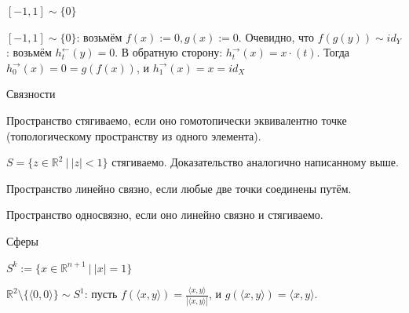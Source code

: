\documentclass[aspectratio=169,dvipsnames,usenames]{beamer}
\begin{document}
\begin{frame}{$[-1,1] \sim \{0\}$}

$[-1,1] \sim \{0\}$: возьмём $f(x) := 0, g(x) := 0$. Очевидно, что $f(g(y)) \sim id_Y$: возьмём $h^\leftarrow_t(y) = 0$.
В обратную сторону: $h^\rightarrow_t(x) = x\cdot (t)$. Тогда $h^\rightarrow_0(x) = 0 = g(f(x))$, и
$h^\rightarrow_1(x) = x = id_X$

\begin{center}\end{center}\vspace{-0.3cm}

\end{frame}

\begin{frame}{Связности}
\begin{dfn}
Пространство стягиваемо, если оно гомотопически эквивалентно точке (топологическому пространству из одного элемента).
\end{dfn}

\begin{exm}
$S = \{z\in\mathbb{R}^2\ |\ |z| < 1\}$ стягиваемо. Доказательство аналогично написанному выше.
\end{exm}

\begin{dfn}
Пространство линейно связно, если любые две точки соединены путём.

Пространство односвязно, если оно линейно связно и стягиваемо.
\end{dfn}

\end{frame}

\begin{frame}{Сферы}
\begin{dfn}
$S^k := \{ x \in \mathbb{R}^{n+1}\ |\ |x| = 1\}$
\end{dfn}
\begin{exm}
$\mathbb{R}^2\setminus\{\langle 0,0\rangle\} \sim S^1$: пусть $f(\langle x,y \rangle) = \frac{\langle x, y \rangle}{|\langle x, y \rangle|}$, и $g(\langle x,y\rangle) = \langle x, y \rangle$.
\end{exm}
\end{frame}
\end{document}
